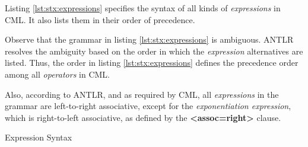Listing \ref{lst:stx:expressions} specifies the syntax of all kinds of \emph{expressions} in CML.
It also lists them in their order of precedence.

Observe that the grammar in listing \ref{lst:stx:expressions} is ambiguous.
ANTLR \cite{antlr} resolves the ambiguity
based on the order in which the \emph{expression} alternatives are listed.
Thus, the order in listing \ref{lst:stx:expressions} defines
the precedence order among all \emph{operators} in CML.

Also, according to ANTLR,
and as required by CML,
all \emph{expressions} in the grammar are left-to-right associative,
except for the \emph{exponentiation expression},
which is right-to-left associative,
as defined by the \textbf{<assoc=right>} clause.

\begin{code}[H]
\verbatimfont{\small}

\caption{Expression Syntax}
\label{lst:stx:expressions}
\end{code}
